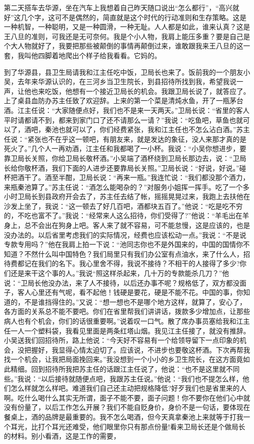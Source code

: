 \documentclass[12pt,oneside]{book}
\begin{document}
第二天搭车去华源，坐在汽车上我想着自己昨天随口说出``怎么都行''，``高兴就好''这几个字，这可不是偶然的，简直就是这个时代的行动准则和生存策略。这是一种机智，一种聪明，又是一种圆滑，一种无耻。人人都是如此，谁来认真？这是王八旦的准则，可我还是无可奈何。我是个小人物，我肩上能压多重？要是自己是个大人物就好了，我要把那些被颠倒的事情再颠倒过来，谁敢跟我来王八旦的这一套，我叫他四脚着地爬出个样子给我看看。它妈的。

到了华源县，县卫生局请我和江主任吃中饭，卫局长也来了。饭前我的一个朋友小吴，去年来华源认识的，在三河乡当卫生院长，到县招待所找到我，希望我说一声，让他也来吃饭，他想有一个接近卫局长的机会。我跟卫局长说了，就答应了。上了桌县血防办苏主任致了欢迎辞。上来的第一个菜是清炖水鱼，开了一瓶茅台酒。江主任说：``大家随便点好，我们也不是来一天两天。''卫局长说：``省里的客人平时请都请不到，都来到家门口了还不请那么一请？''我说：``吃鱼吧，草鱼也就可以了，酒吧，秦池也就可以了，你们经费紧张，我和江主任也不怎么沾白酒。''苏主任说：``紧张也不在乎这一顿吧，有朋友来，就是发达的象征，没人来那才真的是死火了。''几个人一再劝酒，江主任和我都喝了一小杯。我说：``小吴你想进步，要靠卫局长关照，你给卫局长敬杯酒。''小吴端了酒杯绕到卫局长那边去，说：``卫局长给你敬杯酒，我们下面的人进步还要靠局长关照。''卫局长说：``好说，好说。''碰杯把酒干了。酒至半酣，卫局长说：``再来一瓶。''我连忙说：``我们都没那个酒力，来瓶秦池算了。''苏主任说：``酒怎么能喝杂的？''对服务小姐挥一挥手。吃了一个多小时卫局长到县政府开会去了，苏主任去结了帐，摇摇晃晃过来，我跑上去扶他在沙发上坐了，我说：``这一顿去了好几百吧，酒都块五百了。''他说：``吃是吃不穷的，不吃也富不了。''我说：``经常来人这么招待，你们受得了?''他说：``羊毛出在羊身上，总不会出在狗身上吧。客人来了就不容易，可不能怠慢，这是应该的，也是没办法的。以后省里考虑我们的实际情况，经费也应该松动一点。''我说：``不是说专款专用吗？''他在我肩上拍一下说：``池同志你也不是外国来的，中国的国情你不知道？不然什么叫中国特色？我们局里只有我们办公室有点油水，来了什么人，招待费都记在我们的名下。我心里舍不得，我说不接待？不相干的人接得了多少?你们还是来干这个事的人。''我说``照这样杀起来，几十万的专款能杀几刀？''他说：``卫局长他没办法，来了人不接待，以后还办事不呢？规格低了，双方都没面子，客人心里还有气呢，看不起他！钱硬是要花，硬是不能不花。中国的事，你知道的，不是谁挡得住的。''又说：``想一想也不是哪个地方这样，就算了，安心了，各方面的关系总不能不要吧。你们在省里帮我们讲讲话，拨款多少增加点，让那些病人也有个机会，你们的话很重要啊。''说着叹一口气。散了席办事员塞给我和江主任一人一个塑料袋，我看见里面是两条红塔山烟。我见江主任接了，就没有推辞。小吴送我们回招待所，路上他说：``今天好不容易有一个给领导留下一点印象的机会，没把握好，我显得心情太迫切了。应该说，不进步也要敬这杯酒。下次再帮我找一个机会，让我把局面挽回来。''我没想到一个小小的乡卫生院长，在这方面竟如此精细。回到招待所我把苏主任的话跟江主任说了，他说：``也不是这里就不同些。''我说：``以后接待就随便点吧，我跟苏主任说。''他说：``我们也不提怎么样，他们怎么样就怎么样吧。难道我们自己还主动把规格降低?好歹我们也是省里来的人啊。吃什么喝什么其实无所谓，面子不能不要，面子问题！你不要你在他们心中就没有份量了，以后工作怎么开展？我们不能自贬身价，身价不是一句话，要体现在餐桌上，酒的品牌是最重要的。我不怎么喝酒，但今天真拿秦池上来就等于打我一个耳光，比打个耳光还难受，他们眼里你只有那点份量!看来卫局长还是个做局长的材料。别小看酒，这是工作的需要，
\end{document}
